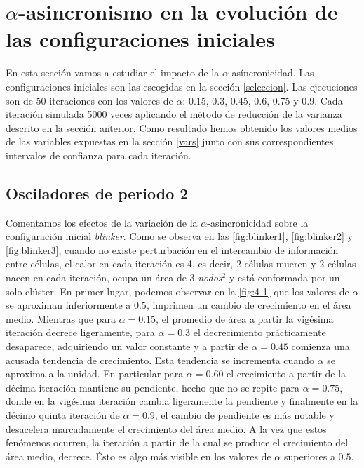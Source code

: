 \documentclass[../proyecto.tex]{memoir}
\begin{document}
\section{$\alpha$-asincronismo en la evolución de las configuraciones iniciales}

En esta sección vamos a estudiar el impacto de la $\alpha$-asíncronicidad. Las configuraciones iniciales son las escogidas en la sección \ref{seleccion}. Las ejecuciones son de 50 iteraciones con los valores de $\alpha$: 0.15, 0.3, 0.45, 0.6, 0.75 y 0.9. Cada iteración simulada 5000 veces aplicando el método de reducción de la varianza descrito en la sección anterior. Como resultado hemos obtenido los valores medios de las variables expuestas en la sección \ref{vars} junto con sus correspondientes intervalos de confianza para cada iteración.

\subsection{Osciladores de periodo 2}

Comentamos los efectos de la variación de la $\alpha$-asincronicidad sobre la configuración inicial \textit{blinker}. Como se observa en las \autoref{fig:blinker1}, \autoref{fig:blinker2} y \autoref{fig:blinker3}, cuando no existe perturbación en el intercambio de información entre células, el calor en cada iteración es 4, es decir, 2 células mueren y 2 células nacen en cada iteración, ocupa un área de 3 \textit{nodos}$^2$ y está conformada por un solo clúster. En primer lugar, podemos observar en la \autoref{fig:4-1} que los valores de $\alpha$ se aproximan inferiormente a $0.5$, imprimen un cambio de crecimiento en el área medio. Mientras que para $\alpha=0.15$, el promedio de área a partir la vigésima iteración decrece ligeramente, para $\alpha=0.3$ el decrecimiento prácticamente desaparece, adquiriendo un valor constante y a partir de $\alpha=0.45$ comienza una acusada tendencia de crecimiento. Esta tendencia se incrementa cuando $\alpha$ se aproxima a la unidad. En particular para $\alpha=0.60$ el crecimiento a partir de la décima iteración mantiene su pendiente, hecho que no se repite para $\alpha=0.75$, donde en la vigésima iteración cambia ligeramente la pendiente y finalmente en la décimo quinta iteración de $\alpha=0.9$, el cambio de pendiente es más notable y desacelera marcadamente el crecimiento del área medio. A la vez que estos fenómenos ocurren, la iteración a partir de la cual se produce el crecimiento del área medio, decrece. Ésto es algo más visible en los valores de $\alpha$ superiores a $0.5$.
\end{document}
